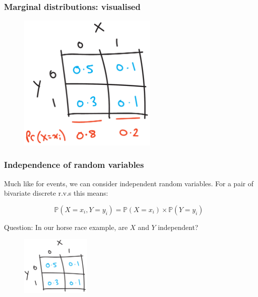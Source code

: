 \documentclass{beamer}
\begin{document}
	\begin{frame}
		\frametitle{Marginal distributions: visualised}
		
			\begin{figure}[ht]
				\centerline{\includegraphics[width=0.6\textwidth]{./figures/horse_race_marginal.pdf}}
			\end{figure}
			
	\end{frame}
	
		\begin{frame}
			\frametitle{Independence of random variables}
			
			Much like for events, we can consider independent random variables. For a pair of bivariate discrete r.v.s this means:
			
			\begin{equation}
			\mathbb{P}(X=x_i, Y=y_i) = \mathbb{P}(X=x_i) \times \mathbb{P}(Y=y_i)
			\end{equation}
			
			Question: In our horse race example, are $X$ and $Y$ independent?
			
			\begin{figure}[ht]
				\centerline{\includegraphics[width=0.3\textwidth]{./figures/horse_race_base.pdf}}
			\end{figure}
			
		\end{frame}
		
\end{document}

